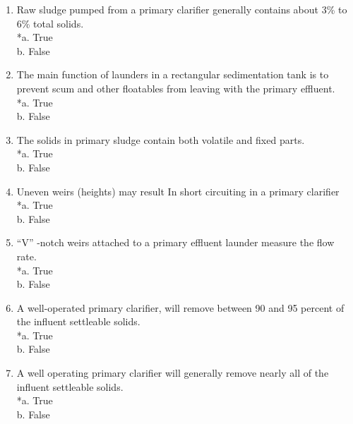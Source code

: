 \begin{enumerate}
\item  Raw sludge pumped from a primary clarifier generally contains about 3\% to 6\% total solids. \\

*a. True \\
b. False \\


\item  The main function of launders in a rectangular sedimentation tank is to prevent scum and other floatables from leaving with the primary effluent. \\

*a. True \\
b. False \\


\item  The solids in primary sludge contain both volatile and fixed parts. \\

*a. True \\
b. False \\


\item  Uneven weirs (heights) may result In short circuiting in a primary clarifier \\

*a. True \\
b. False \\


\item  “V” -notch weirs attached to a primary effluent launder measure the flow rate. \\

*a. True \\
b. False \\


\item  A well-operated primary clarifier, will remove between 90 and 95 percent of the influent settleable solids. \\

*a. True \\
b. False \\


\item  A well operating primary clarifier will generally remove nearly all of the influent settleable solids. \\

*a. True \\
b. False \\



\end{enumerate}
